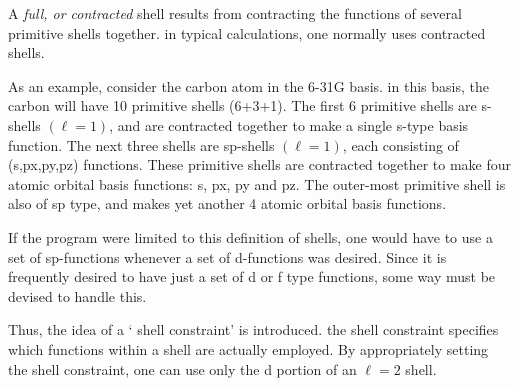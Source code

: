 A {\em full, or contracted} shell results from contracting
the functions of several primitive shells together.
in typical calculations, one normally uses contracted
shells.

As an example, consider the carbon atom in the 6-31G basis.
in this basis, the carbon will have 10 primitive shells
(6+3+1).  The first 6 primitive shells are s-shells $(\ell = 1)$,
and are contracted together to make a single s-type basis
function.  The next three shells are sp-shells $(\ell = 1)$,
each consisting of (s,px,py,pz) functions.  These primitive
shells are contracted together to make four atomic orbital
basis functions: s, px, py and pz.  The outer-most primitive
shell is also of sp type, and makes yet another 4 atomic
orbital basis functions.

If the program were limited to this definition of shells,
one would have to use a set of sp-functions whenever
a set of d-functions was desired.  Since it is frequently
desired to have just a set of d or f type functions,
some way must be devised to handle this.

Thus,  the idea of a ` shell constraint' is introduced.
the shell constraint specifies which functions within
a shell are actually employed.  By appropriately setting
the shell constraint, one can use only the d portion
of an $\ell = 2$ shell.

